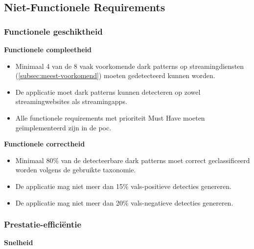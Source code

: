 \subsection{Niet-Functionele Requirements}

\vspace{1em}

\subsubsection{Functionele geschiktheid}
\vspace{1em}

\hspace*{1.5em}\textbf{Functionele compleetheid}

\begin{itemize}
    \item Minimaal 4 van de 8 vaak voorkomende dark patterns op streamingdiensten (\ref{subsec:meest-voorkomend}) moeten gedetecteerd kunnen worden.
    \item De applicatie moet dark patterns kunnen detecteren op zowel streamingwebsites als streamingapps.
    \item Alle functionele requirements met prioriteit Must Have moeten geïmplementeerd zijn in de \acrshort{poc}.
\end{itemize}

\vspace{0.5em}

\hspace*{1.5em}\textbf{Functionele correctheid}

\begin{itemize}
    \item Minimaal 80\% van de detecteerbare dark patterns moet correct geclassificeerd worden volgens de gebruikte taxonomie.
    \item De applicatie mag niet meer dan 15\% vals-positieve detecties genereren.
    \item De applicatie mag niet meer dan 20\% vals-negatieve detecties genereren.
\end{itemize}

\newpage

\subsubsection{Prestatie-efficiëntie}
\vspace{1em}

\hspace*{1.5em}\textbf{Snelheid}

